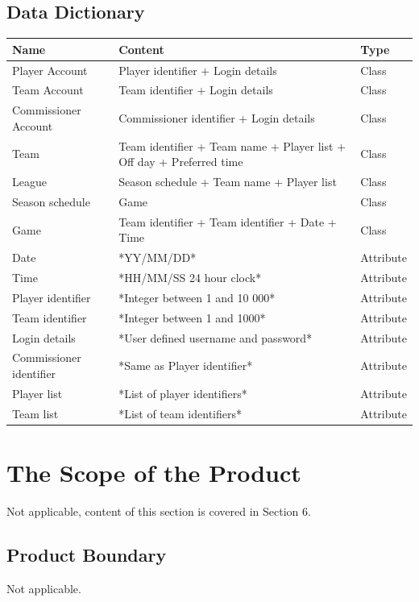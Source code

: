 \documentclass[12pt]{article}
\begin{document}
\subsection{Data Dictionary}
\begin{center}
  \begin{tabular}{|m{3cm}|m{8cm}|m{2cm}|}
    \hline
    Name & Content & Type\\
    \hline
    Player Account & Player identifier + Login details & Class\\
    \hline
    Team Account & Team identifier + Login details & Class\\
    \hline
    Commissioner Account & Commissioner identifier + Login details & Class\\
    \hline
    Team & Team identifier + Team name + Player list + Off day + Preferred
    time & Class\\
    \hline
    League & Season schedule + Team name + Player list & Class\\
    \hline
    Season schedule & {Game} & Class\\
    \hline
    Game & Team identifier + Team identifier + Date + Time & Class\\
    \hline
    Date & *YY/MM/DD* & Attribute\\
    \hline
    Time & *HH/MM/SS 24 hour clock*& Attribute\\
    \hline
    Player identifier & *Integer between 1 and 10 000* & Attribute\\
    \hline
    Team identifier & *Integer between 1 and 1000* & Attribute\\
    \hline
    Login details & *User defined username and password*& Attribute\\
    \hline
    Commissioner identifier & *Same as Player identifier* & Attribute\\
    \hline
    Player list & *List of player identifiers* & Attribute\\
    \hline
    Team list & *List of team identifiers* & Attribute\\
    \hline
  \end{tabular}
\end{center}

\section{The Scope of the Product}
Not applicable, content of this section is covered in Section 6.
\subsection{Product Boundary}
Not applicable.
\end{document}

